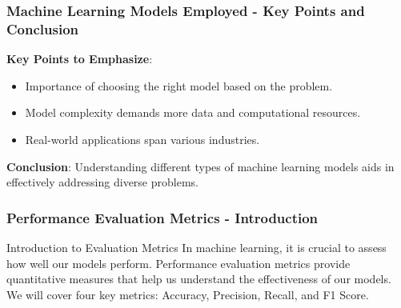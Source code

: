 \documentclass[aspectratio=169]{beamer}
\begin{document}
\begin{frame}[fragile]
    \frametitle{Machine Learning Models Employed - Key Points and Conclusion}
    \textbf{Key Points to Emphasize}:
    \begin{itemize}
        \item Importance of choosing the right model based on the problem.
        \item Model complexity demands more data and computational resources.
        \item Real-world applications span various industries.
    \end{itemize}

    \textbf{Conclusion}: 
    Understanding different types of machine learning models aids in effectively addressing diverse problems.
\end{frame}

\begin{frame}[fragile]
    \frametitle{Performance Evaluation Metrics - Introduction}
    \begin{block}{Introduction to Evaluation Metrics}
        In machine learning, it is crucial to assess how well our models perform. 
        Performance evaluation metrics provide quantitative measures that help us understand 
        the effectiveness of our models. 
        We will cover four key metrics: Accuracy, Precision, Recall, and F1 Score.
    \end{block}
\end{frame}
\end{document}
